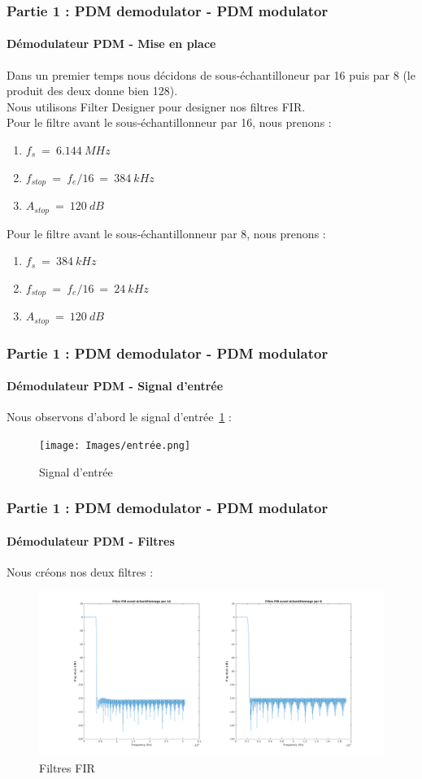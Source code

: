 \documentclass[
10pt,
aspectratio=169,
]{beamer}
\begin{document}
\begin{frame} 
\frametitle{Partie 1 : PDM demodulator - PDM modulator} 
\framesubtitle{Démodulateur PDM - Mise en place} 
Dans un premier temps nous décidons de sous-échantilloneur par 16 puis par 8 (le produit des deux donne bien 128). \\
Nous utilisons Filter Designer pour designer nos filtres FIR.\\
Pour le filtre avant le sous-échantillonneur par 16, nous prenons : 
\begin{enumerate}
    \item $f_s~=~6.144~MHz$
    \item $f_{stop}~=~f_e/16~=~384~kHz$
    \item $A_{stop}~=~120~dB$
\end{enumerate}
\vspace*{0.7cm}
Pour le filtre avant le sous-échantillonneur par 8, nous prenons : 
\begin{enumerate}
    \item $f_s~=~384~kHz$
    \item $f_{stop}~=~f_e/16~=~24~kHz$
    \item $A_{stop}~=~120~dB$
\end{enumerate}
\end{frame}

\begin{frame}
\frametitle{Partie 1 : PDM demodulator - PDM modulator} 
\framesubtitle{Démodulateur PDM - Signal d'entrée} 
Nous observons d'abord le signal d'entrée~\ref{fig:entrée} : 
\begin{figure}[h]
    \centering
    \texttt{[image: Images/entrée.png]}
    \caption{Signal d'entrée}
    \label{fig:entrée}
\end{figure}
\end{frame}

\begin{frame}
\frametitle{Partie 1 : PDM demodulator - PDM modulator} 
\framesubtitle{Démodulateur PDM - Filtres} 
Nous créons nos deux filtres : 
\begin{figure}[h]
    \centering
    \includegraphics[scale=0.2]{Images/FIR.png}
    \caption{Filtres FIR}
    \label{fig:FIR}
\end{figure}
\end{frame}
\end{document}
